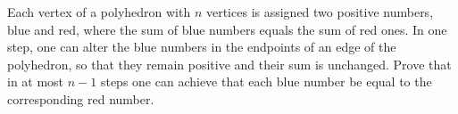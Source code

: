\problem
Each vertex of a polyhedron with $n$ vertices is assigned two positive numbers,
blue and red, where the sum of blue numbers equals the sum of red ones.
In one step, one can alter the blue numbers in the endpoints of an edge of the
polyhedron, so that they remain positive and their sum is unchanged.
Prove that in at most $n-1$ steps one can achieve that each blue number be
equal to the corresponding red number.
\solution
\endproblem
